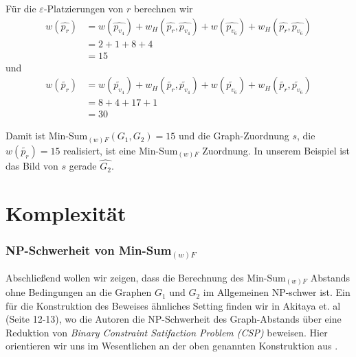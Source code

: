 \documentclass[a4paper, 12pt, twoside]{article}
\theoremstyle{Format1} %
\begin{document}
Für die $\varepsilon$-Platzierungen von $r$ berechnen wir
\begin{equation} \label{min_sum_weight_root_hat}
	\begin{split}
		w(\widehat{p_{r}}) & = w(\widehat{p_{v_4}}) + w_H(\widehat{p_{r}}, \widehat{p_{v_4}}) + w(\widehat{p_{v_6}}) + w_H(\widehat{p_{r}}, \widehat{p_{v_6}}) \\
		& = 2 + 1 + 8 + 4 \\
		& = 15
	\end{split}
\end{equation}
und
\begin{equation} \label{min_sum_weight_root_tilde}
	\begin{split}
		w(\widetilde{p_{r}}) & = w(\widetilde{p_{v_4}}) + w_H(\widetilde{p_{r}}, \widetilde{p_{v_4}}) + w(\widetilde{p_{v_6}}) + w_H(\widetilde{p_{r}}, \widetilde{p_{v_6}}) \\
		& = 8 + 4 + 17 + 1 \\
		& = 30
	\end{split}
\end{equation}

Damit ist Min-Sum$_{(w)F}(G_1,G_2) = 15$ und die Graph-Zuordnung $s$, die $w(\widetilde{p_{r}}) = 15$ realisiert, ist eine Min-Sum$_{(w)F}$ Zuordnung.
In unserem Beispiel ist das Bild von $s$ gerade $\widehat{G_2}$.

\newpage
\section{Komplexität} \label{Kapitel 4}

\subsubsection{NP-Schwerheit von Min-Sum$_{(w)F}$}

Abschließend wollen wir zeigen, dass die Berechnung des Min-Sum$_{(w)F}$ Abstands ohne Bedingungen an die Graphen $G_1$ und $G_2$ im Allgemeinen
NP-schwer ist. Ein für die Konstruktion des Beweises ähnliches Setting finden wir in Akitaya et. al \cite{Akitaya} (Seite 12-13), wo die Autoren die NP-Schwerheit des Graph-Abstands
über eine Reduktion von \textit{Binary Constraint Satifaction Problem (CSP)} beweisen.
Hier orientieren wir uns im Wesentlichen an der oben genannten Konstruktion aus \cite{Akitaya}.
\end{document}
